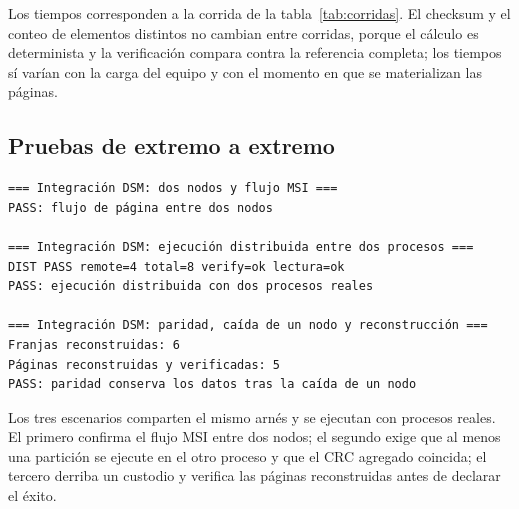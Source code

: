 Los tiempos corresponden a la corrida de la tabla~\ref{tab:corridas}. El checksum y el conteo de elementos distintos no cambian entre corridas, porque el cálculo es determinista y la verificación compara contra la referencia completa; los tiempos sí varían con la carga del equipo y con el momento en que se materializan las páginas.

\subsection{Pruebas de extremo a extremo}

\begin{lstlisting}[caption={Resultados de los tres escenarios de \texttt{make test-e2e}.}, label={lst:salida-e2e}]
=== Integración DSM: dos nodos y flujo MSI ===
PASS: flujo de página entre dos nodos

=== Integración DSM: ejecución distribuida entre dos procesos ===
DIST PASS remote=4 total=8 verify=ok lectura=ok
PASS: ejecución distribuida con dos procesos reales

=== Integración DSM: paridad, caída de un nodo y reconstrucción ===
Franjas reconstruidas: 6
Páginas reconstruidas y verificadas: 5
PASS: paridad conserva los datos tras la caída de un nodo
\end{lstlisting}

Los tres escenarios comparten el mismo arnés y se ejecutan con procesos reales. El primero confirma el flujo MSI entre dos nodos; el segundo exige que al menos una partición se ejecute en el otro proceso y que el CRC agregado coincida; el tercero derriba un custodio y verifica las páginas reconstruidas antes de declarar el éxito.
